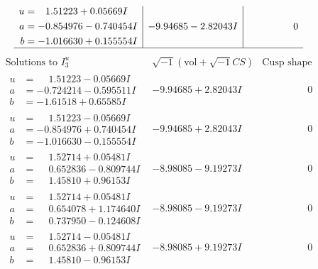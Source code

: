\documentclass[1p]{elsarticle_modified}
\theoremstyle{definition}
\newcommand{\I}{\sqrt{-1}}
\begin{document}
$$\begin{array}{c|c|c}
\begin{aligned}
u &= \phantom{-}1.51223 + 0.05669 I \\
a &= -0.854976 - 0.740454 I \\
b &= -1.016630 + 0.155554 I\end{aligned}
 & -9.94685 - 2.82043 I & \phantom{-0.000000 } 0\\
 \hline 
 \end{array}$$\newpage$$\begin{array}{c|c|c}  
\text{Solutions to }I^u_{3}& \I (\text{vol} + \sqrt{-1}CS) & \text{Cusp shape}\\
 \hline 
\begin{aligned}
u &= \phantom{-}1.51223 - 0.05669 I \\
a &= -0.724214 - 0.595511 I \\
b &= -1.61518 + 0.65585 I\end{aligned}
 & -9.94685 + 2.82043 I & \phantom{-0.000000 } 0 \\ \hline\begin{aligned}
u &= \phantom{-}1.51223 - 0.05669 I \\
a &= -0.854976 + 0.740454 I \\
b &= -1.016630 - 0.155554 I\end{aligned}
 & -9.94685 + 2.82043 I & \phantom{-0.000000 } 0 \\ \hline\begin{aligned}
u &= \phantom{-}1.52714 + 0.05481 I \\
a &= \phantom{-}0.652836 - 0.809744 I \\
b &= \phantom{-}1.45810 + 0.96153 I\end{aligned}
 & -8.98085 - 9.19273 I & \phantom{-0.000000 } 0 \\ \hline\begin{aligned}
u &= \phantom{-}1.52714 + 0.05481 I \\
a &= \phantom{-}0.654078 + 1.174640 I \\
b &= \phantom{-}0.737950 - 0.124608 I\end{aligned}
 & -8.98085 - 9.19273 I & \phantom{-0.000000 } 0 \\ \hline\begin{aligned}
u &= \phantom{-}1.52714 - 0.05481 I \\
a &= \phantom{-}0.652836 + 0.809744 I \\
b &= \phantom{-}1.45810 - 0.96153 I\end{aligned}
 & -8.98085 + 9.19273 I & \phantom{-0.000000 } 0 \\ \hline\begin{aligned}

\end{aligned}
\end{array}$$
\end{document}
